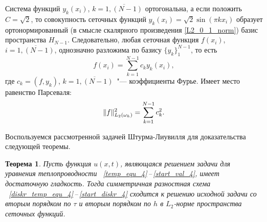 \documentclass[11pt,a4paper,twoside]{report}
\numberwithin{equation}{section}
\theoremstyle{definition}
\theoremstyle{plain}
\newtheorem*{theorem*}{Теорема}
\DeclarePairedDelimiter\norm{\lVert}{\rVert}
\begin{document}
Система функций $y_k(x_i)$, $k = \overline{1, (N-1)}$ ортогональна, а если положить
$C = \sqrt2$, то совокупность сеточных функций $y_k(x_i) = \sqrt2\sin(\pi kx_i)$
образует ортонормированный (в смысле скалярного произведения \eqref{L2_0_1_norm})
базис пространства $H_{N-1}$. Следовательно, любая сеточная функция $f(x_i)$,
$i=\overline{1, (N-1)}$, однозначно разложима по базису $\{y_k\}_1^{N-1}$,
то есть
%
$$
    f(x_i) = \sum\limits_{k=1}^{N-1}c_ky_k(x_i),
$$
%
где $c_k = (f, y_k)$, $k=\overline{1, (N-1)}$~"--- коэффициенты Фурье. Имеет место
равенство Парсеваля:
%
\begin{equation}
    \label{eq:Parsival-eq}
    \norm{f}^2_{L_2(\omega_h)} = \sum\limits_{k=1}^{N-1}c^2_k.
\end{equation}
%

Воспользуемся рассмотренной задачей Штурма-Лиувилля для доказательства
следующей теоремы.
%
\begin{theorem*}
%
    Пусть функция $u(x, t)$, являющаяся решением задачи для уравнения теплопроводности
   ~\eqref{temp_equ_4}\,--\,\eqref{start_val_4}, имеет достаточную гладкость.
   Тогда симметричная разностная схема
   ~\eqref{diskr_temp_equ_4}\,--\,\eqref{start_diskr_4} сходится к
    решению исходной задачи со вторым порядком по $\tau$ и
    вторым порядком по $h$ в $L_2$-норме пространства сеточных функций.
%
\end{theorem*}
%
\end{document}
